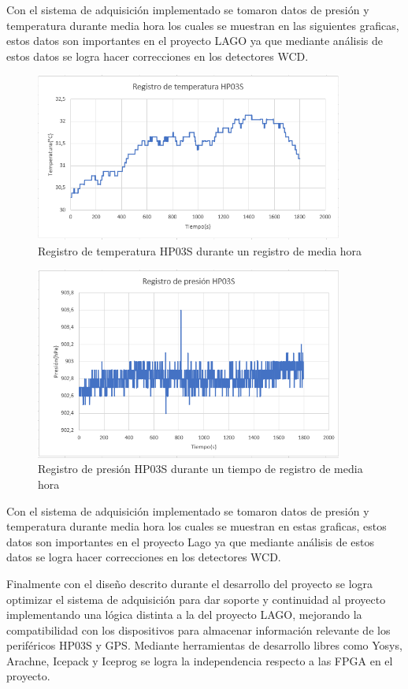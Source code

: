 Con el sistema de adquisición implementado se tomaron datos de presión y temperatura durante media hora los cuales se muestran en las siguientes graficas, estos datos son importantes en el proyecto LAGO ya que mediante análisis de estos datos se logra hacer correcciones en los detectores WCD. 


\begin{figure}[H]
\includegraphics[width=0.9\textwidth]{Figs/TEMPERATURA.PNG} 
\centering
\caption{Registro de temperatura HP03S durante un registro de media hora}
\label{temp}
\end{figure}

\begin{figure}[H]
\includegraphics[width=0.9\textwidth]{Figs/presion.PNG} 
\centering
\caption{Registro de presión HP03S durante un tiempo de registro de media hora}
\label{pre}
\end{figure}

Con el sistema de adquisición implementado se tomaron datos de presión y temperatura durante media hora los cuales se muestran en estas graficas, estos datos son importantes en el proyecto Lago ya que mediante análisis de estos datos se logra hacer correcciones en los detectores WCD. 

Finalmente con el diseño descrito durante el desarrollo del proyecto se logra optimizar el sistema de adquisición para dar soporte y continuidad al proyecto implementando una lógica distinta a la del proyecto LAGO, mejorando la compatibilidad con los dispositivos para almacenar información relevante de los periféricos HP03S y GPS. Mediante herramientas de desarrollo libres como Yosys, Arachne, Icepack y Iceprog se logra la independencia respecto a las FPGA en el proyecto. 

